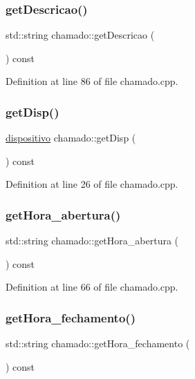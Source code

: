 \subsubsection{\texorpdfstring{get\+Descricao()}{getDescricao()}}
{\footnotesize\ttfamily std\+::string chamado\+::get\+Descricao (\begin{DoxyParamCaption}{ }\end{DoxyParamCaption}) const}



Definition at line 86 of file chamado.\+cpp.

\hypertarget{classchamado_a427d40963fc8728e01491902ccf1337c}{}\label{classchamado_a427d40963fc8728e01491902ccf1337c} 
\subsubsection{\texorpdfstring{get\+Disp()}{getDisp()}}
{\footnotesize\ttfamily \hyperlink{classdispositivo}{dispositivo} chamado\+::get\+Disp (\begin{DoxyParamCaption}{ }\end{DoxyParamCaption}) const}



Definition at line 26 of file chamado.\+cpp.

\hypertarget{classchamado_ac3e3786e54b646f1c3757944b3721052}{}\label{classchamado_ac3e3786e54b646f1c3757944b3721052} 
\subsubsection{\texorpdfstring{get\+Hora\+\_\+abertura()}{getHora\_abertura()}}
{\footnotesize\ttfamily std\+::string chamado\+::get\+Hora\+\_\+abertura (\begin{DoxyParamCaption}{ }\end{DoxyParamCaption}) const}



Definition at line 66 of file chamado.\+cpp.

\hypertarget{classchamado_ad59c464a0e3afa7625c228dce0d7881b}{}\label{classchamado_ad59c464a0e3afa7625c228dce0d7881b} 
\subsubsection{\texorpdfstring{get\+Hora\+\_\+fechamento()}{getHora\_fechamento()}}
{\footnotesize\ttfamily std\+::string chamado\+::get\+Hora\+\_\+fechamento (\begin{DoxyParamCaption}{ }\end{DoxyParamCaption}) const}



